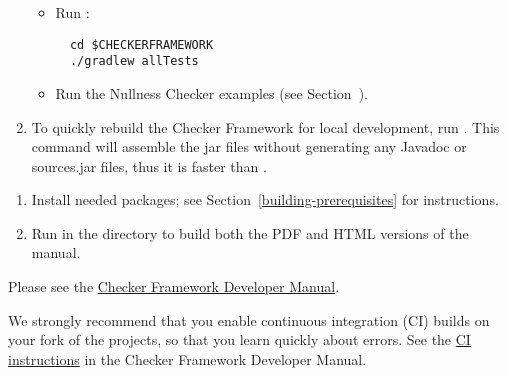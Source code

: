 \begin{enumerate}
\begin{itemize}
  \item Run :
\begin{Verbatim}
  cd $CHECKERFRAMEWORK
  ./gradlew allTests
\end{Verbatim}

  \item Run the Nullness Checker examples (see
    Section~).

  \end{itemize}

\item To quickly rebuild the Checker Framework for local development,
run . This command will assemble the jar
files without generating any Javadoc or sources.jar files, thus it is
faster than .

\end{enumerate}



\begin{enumerate}
\item
Install needed packages; see Section~\ref{building-prerequisites} for
instructions.

\item
Run  in the  directory to build both the PDF and HTML versions of the manual.
\end{enumerate}



Please see the
\href{https://htmlpreview.github.io/?https://github.com/eisop/checker-framework/master/docs/developer/developer-manual.html}{Checker Framework Developer Manual}.



We strongly recommend that you enable continuous integration (CI) builds on
your fork of the projects, so that you learn quickly about errors.  See the
\href{https://htmlpreview.github.io/?https://github.com/eisop/checker-framework/master/docs/developer/developer-manual.html\#ci}{CI
  instructions} in the Checker Framework Developer Manual.



